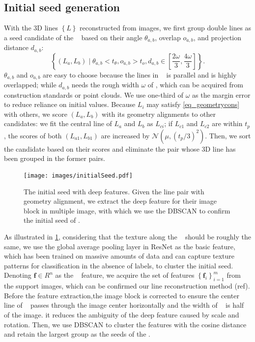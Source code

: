 \subsection{Initial seed generation}
\label{sec_initialseed}
With the 3D lines $\left\{L\right\}$ reconstructed from images,
we first group double lines as a seed candidate of the \rlp~  based on their angle $\theta_{a,b}$,
overlap $o_{a,b}$,
and projection distance $d_{a,b}$:
\begin{equation}
   \left\{\left(L_a, L_b\right) \mid \theta_{a,b} < t_\theta, o_{a,b} > t_o, d_{a,b} \in \left[\frac{2\omega}{3} ,\frac{4\omega}{3}\right]  \right\}.
    \label{eq_geometrycons}
\end{equation}
$\theta_{a,b}$ and $o_{a,b}$ are easy to choose
because the lines in \rlp~ is parallel and is highly overlapped;
while $d_{a,b}$ needs the rough width $\omega$ of \rlp,
which can be acquired from construction standards or point clouds.
We use one-third of $\omega$ as the margin error to reduce reliance on initial values.
Because $L_i$ may satisfy \cref{eq_geometrycons} with others,
we score $\left(L_a, L_b\right)$ with its geometry alignments to other candidates:
we fit the central line of $L_{a}$ and $L_{b}$ as $L_{ci}$;
if $L_{c1}$ and $L_{c2}$ are within $t_p$,
the scores of both $\left(L_{a1}, L_{b1}\right)$ are increased by $\mathcal{N}\left(\mu, \left(t_p/3\right)^2\right)$.
Then,
we sort the candidate based on their scores and eliminate the pair whose 3D line has been grouped in the former pairs.

\begin{figure}[h]
    \centering
    \texttt{[image: images/initialSeed.pdf]}
    \caption{The initial seed with deep features.
    Given the line pair with geometry alignment, 
    we extract the deep feature for their image block in multiple image,
    with which we use the DBSCAN to confirm the initial seed of \rlp.}
    \label{fig_initialseed}
\end{figure}

As illustrated in \cref{fig_initialseed}, considering that the texture along the \rlp~ should be roughly the same, 
we use the global average pooling layer in ResNet as the basic feature,
which has been trained on massive amounts of data and can capture texture patterns for classification in the absence of labels,
to cluster the initial seed.
Denoting $\mathbf f \in R^n$ as the \rlp~ feature,
we acquire the set of features $\left\{\mathbf f_i\right\}_{i=1}^m$ from the support images,
which can be confirmed our line reconstruction method (ref).
Before the feature extraction,the image block is corrected to ensure
the center line of \rlp~ passes through the image center horizontally and the width of \rlp~ is half of the image.
it reduces the ambiguity of the deep feature caused by scale and rotation.
Then,
we use DBSCAN to cluster the features with the cosine distance and retain the largest group as the seeds of the \rlp.

